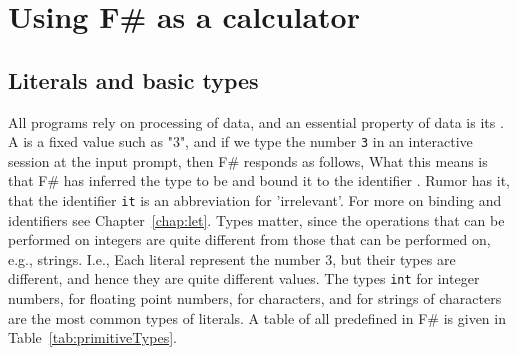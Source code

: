 \chapter{Using F\# as a calculator}
\section{Literals and basic types}
All programs rely on processing of data, and an essential property of data is its . A  is a fixed value such as "3", and if we type the number \lstinline!3! in an interactive session at the input prompt, then F\# responds as follows,
%
%
What this means is that F\# has inferred the type to be  and bound it to the identifier . Rumor has it, that the identifier \lstinline|it| is an abbreviation for 'irrelevant'. For more on binding and identifiers see Chapter~\ref{chap:let}. Types matter, since the operations that can be performed on integers are quite different from those that can be performed on, e.g., strings. I.e.,
%
%
Each literal represent the number 3, but their types are different, and hence they are quite different values. The types \lstinline!int! for integer numbers,  for floating point numbers,  for characters, and  for strings of characters are the most common types of literals. A table of all  predefined in F\# is given in Table~\ref{tab:primitiveTypes}.
